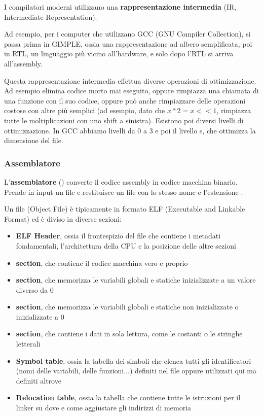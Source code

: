 \documentclass[11pt, a4paper, titlepage, oneside]{scrbook}
\begin{document}
\begin{Definizione}
\label{def-rappresentazione-intermedia}
I compilatori moderni utilizzano una \textbf{rappresentazione intermedia} (IR, Intermediate Representation).
\end{Definizione}
Ad esempio, per i computer che utilizzano GCC (GNU Compiler Collection), si passa prima in GIMPLE, ossia una rappresentazione ad albero semplificata, poi in RTL, un linguaggio più vicino all'hardware, e solo dopo l'RTL si arriva all'assembly.

Questa rappresentazione intermedia effettua diverse operazioni di ottimizzazione. Ad esempio elimina codice morto mai eseguito, oppure rimpiazza una chiamata di una funzione con il suo codice, oppure può anche rimpiazzare delle operazioni costose con altre più semplici (ad esempio, dato che $x * 2 = x <<1$, rimpiazza tutte le moltiplicazioni con uno shift a sinistra). Esistono poi diversi livelli di ottimizzazione. In GCC abbiamo livelli da 0 a 3 e poi il livello s, che ottimizza la dimensione del file.

\subsubsection*{Assemblatore}

\begin{Definizione}[Assemblatore]
\label{def-assemblatore}
L'\textbf{assemblatore} () converte il codice assembly in codice macchina binario. Prende in input un file  e restituisce un file con lo stesso nome e l'estensione .
\end{Definizione}

Un file  (Object File) è tipicamente in formato ELF (Executable and Linkable Format) ed è diviso in diverse sezioni:
\begin{itemize}
    \item \textbf{ELF Header}, ossia il frontespizio del file che contiene i metadati fondamentali, l'architettura della CPU e la posizione delle altre sezioni
    \item {} \textbf{section}, che contiene il codice macchina vero e proprio
    \item {} \textbf{section}, che memorizza le variabili globali e statiche inizializzate a un valore diverso da 0
    \item {} \textbf{section}, che memorizza le variabili globali e statiche non inizializzate o inizializzate a 0
    \item {} \textbf{section}, che contiene i dati in sola lettura, come le costanti o le stringhe letterali
    \item \textbf{Symbol table}, ossia la tabella dei simboli che elenca tutti gli identificatori (nomi delle variabili, delle funzioni...) definiti nel file oppure utilizzati qui ma definiti altrove
    \item \textbf{Relocation table}, ossia la tabella che contiene tutte le istruzioni per il linker su dove e come aggiustare gli indirizzi di memoria
\end{itemize}
\end{document}
